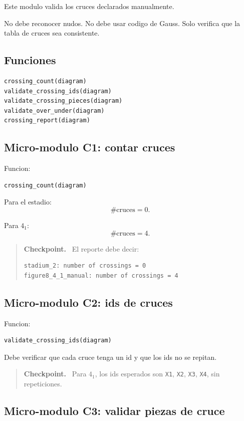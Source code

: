 \documentclass[11pt,letterpaper]{amsart}
\newenvironment{checkpoint}
{\par\medskip\noindent\begin{quote}\textbf{Checkpoint.}\ }
{\end{quote}\par\medskip}
\begin{document}
Este modulo valida los cruces declarados manualmente.

No debe reconocer nudos. No debe usar codigo de Gauss. Solo verifica que la
tabla de cruces sea consistente.

\subsection{Funciones}

\begin{verbatim}
crossing_count(diagram)
validate_crossing_ids(diagram)
validate_crossing_pieces(diagram)
validate_over_under(diagram)
crossing_report(diagram)
\end{verbatim}

\subsection{Micro-modulo C1: contar cruces}

Funcion:
\begin{verbatim}
crossing_count(diagram)
\end{verbatim}

Para el estadio:
\[
\#\text{cruces}=0.
\]

Para \(4_1\):
\[
\#\text{cruces}=4.
\]

\begin{checkpoint}
El reporte debe decir:
\begin{verbatim}
stadium_2: number of crossings = 0
figure8_4_1_manual: number of crossings = 4
\end{verbatim}
\end{checkpoint}

\subsection{Micro-modulo C2: ids de cruces}

Funcion:
\begin{verbatim}
validate_crossing_ids(diagram)
\end{verbatim}

Debe verificar que cada cruce tenga un id y que los ids no se repitan.

\begin{checkpoint}
Para \(4_1\), los ids esperados son \texttt{X1}, \texttt{X2}, \texttt{X3},
\texttt{X4}, sin repeticiones.
\end{checkpoint}

\subsection{Micro-modulo C3: validar piezas de cruce}
\end{document}
